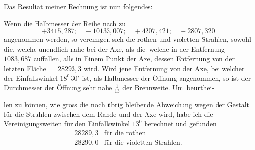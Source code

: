 Das Resultat meiner Rechnung ist nun folgendes:

Wenn die Halbmesser der Reihe nach zu
\[
+3415{,}287;\quad -10133{,}007;\quad +4207{,}421;\quad -2807{,}320
\]
angenommen werden, so vereinigen sich die rothen und violetten Strahlen, sowohl die, welche unendlich nahe bei der Axe, als die, welche in der Entfernung $1083{,}687$ auffallen, alle in Einem Punkt der Axe, dessen Entfernung von der letzten Fläche $=28293{,}3$ wird. Wird jene Entfernung von der Axe, bei welcher der Einfallswinkel $18^0\,30'$ ist, als Halbmesser der Öffnung angenommen, so ist der Durchmesser der Öffnung sehr nahe $\tfrac{1}{13}$ der Brennweite. Um~beurthei-
\par\GaussVSourceGathering{64\textsuperscript{*}}
\par\clearpage
{}
\noindent len zu können, wie gross die noch übrig bleibende Abweichung wegen der Gestalt für die Strahlen zwischen dem Rande und der Axe wird, habe ich die Vereinigungsweiten für den Einfallswinkel $13^0$ berechnet und gefunden
\[
\begin{array}{ll}
28289{,}3&\text{für die rothen}\\
28290{,}0&\text{für die violetten Strahlen.}
\end{array}
\]

